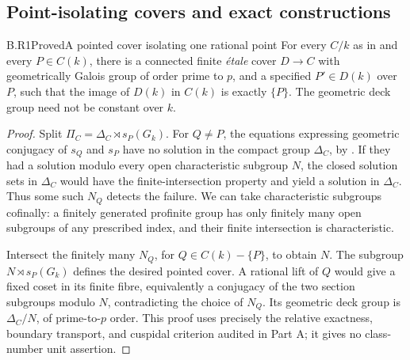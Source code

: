 \subsection{Point-isolating covers and exact constructions}

\begin{claim}{B.R1}{Proved}{A pointed cover isolating one rational point}
For every $C/k$ as in  and every $P\in C(k)$,
there is a connected finite \emph{\'etale} cover $D\to C$ with
geometrically Galois group of order prime to $p$, and a specified
$P'\in D(k)$ over $P$, such that the image of $D(k)$ in $C(k)$ is
exactly $\{P\}$. The geometric deck group need not be constant over $k$.
\end{claim}
\begin{proof}
Split $\Pi_C=\Delta_C\rtimes s_P(G_k)$. For $Q\ne P$, the equations
expressing geometric conjugacy of $s_Q$ and $s_P$ have no solution
in the compact group $\Delta_C$, by . If they had
a solution modulo every open characteristic subgroup $N$, the
closed solution sets in $\Delta_C$ would have the finite-intersection
property and yield a solution in $\Delta_C$. Thus some such $N_Q$
detects the failure. We can take characteristic subgroups cofinally:
a finitely generated profinite group has only finitely many open
subgroups of any prescribed index, and their finite intersection
is characteristic.

Intersect the finitely many $N_Q$, for $Q\in C(k)-\{P\}$, to obtain
$N$. The subgroup $N\rtimes s_P(G_k)$ defines the desired pointed
cover. A rational lift of $Q$ would give a fixed coset in its finite
fibre, equivalently a conjugacy of the two section subgroups modulo
$N$, contradicting the choice of $N_Q$. Its geometric deck group
is $\Delta_C/N$, of prime-to-$p$ order. This proof uses precisely
the relative exactness, boundary transport, and cuspidal criterion
audited in Part A; it gives no class-number unit assertion.
\end{proof}

